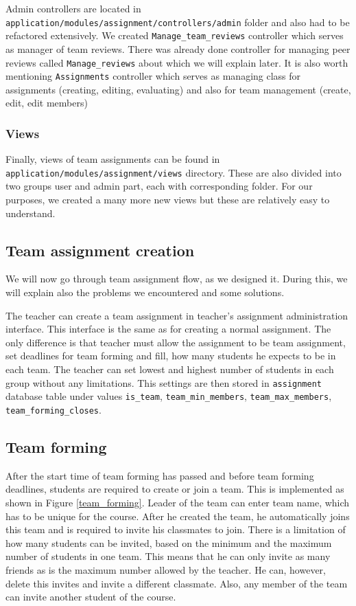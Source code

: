Admin controllers are located in \\ \texttt{application/modules/assignment/controllers/admin} folder and also had to be refactored extensively. We created \texttt{Manage\_team\_reviews} controller which serves as manager of team reviews. There was already done controller for managing peer reviews called \texttt{Manage\_reviews} about which we will explain later. It is also worth mentioning \texttt{Assignments} controller which serves as managing class for assignments (creating, editing, evaluating) and also for team management (create, edit, edit members)

\subsubsection{Views}
Finally, views of team assignments can be found in \\ \texttt{application/modules/assignment/views} directory. These are also divided into two groups user and admin part, each with corresponding folder. For our purposes, we created a many more new views but these are relatively easy to understand.

\subsection{Team assignment creation}
We will now go through team assignment flow, as we designed it. During this, we will explain also the problems we encountered and some solutions.

The teacher can create a team assignment in teacher's assignment administration interface. This interface is the same as for creating a normal assignment. The only difference is that teacher must allow the assignment to be team assignment, set deadlines for team forming and fill, how many students he expects to be in each team. The teacher can set lowest and highest number of students in each group without any limitations. This settings are then stored in \texttt{assignment} database table under values \texttt{is\_team}, \texttt{team\_min\_members}, \texttt{team\_max\_members}, \texttt{team\_forming\_closes}.

\subsection{Team forming}
After the start time of team forming has passed and before team forming deadlines, students are required to create or join a team. This is implemented as shown in Figure \ref{team_forming}. Leader of the team can enter team name, which has to be unique for the course. After he created the team, he automatically joins this team and is required to invite his classmates to join. There is a limitation of how many students can be invited, based on the minimum and the maximum number of students in one team. This means that he can only invite as many friends as is the maximum number allowed by the teacher. He can, however, delete this invites and invite a different classmate. Also, any member of the team can invite another student of the course.

